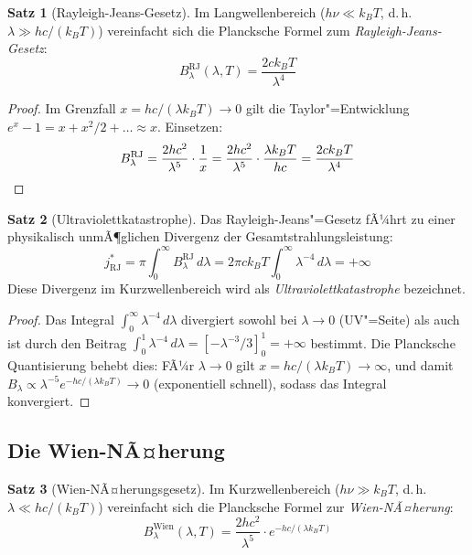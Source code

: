 ﻿\documentclass[a4paper,12pt]{article}
\theoremstyle{definition}
\newtheorem{satz}{Satz}
\begin{document}
\begin{satz}[Rayleigh-Jeans-Gesetz]
\label{satz:rj}
    Im Langwellenbereich ($h\nu \ll k_B T$, d.\,h.\ $\lambda \gg hc/(k_BT)$)
    vereinfacht sich die Plancksche Formel zum \emph{Rayleigh-Jeans-Gesetz}:
    \[
        B_\lambda^{\text{RJ}}(\lambda, T)
        = \frac{2ck_BT}{\lambda^4}
    \]
\end{satz}

\begin{proof}
    Im Grenzfall $x = hc/(\lambda k_BT) \to 0$ gilt die Taylor"=Entwicklung
    $e^x - 1 = x + x^2/2 + \ldots \approx x$. Einsetzen:
    \[
        B_\lambda^{\text{RJ}} = \frac{2hc^2}{\lambda^5} \cdot \frac{1}{x}
        = \frac{2hc^2}{\lambda^5} \cdot \frac{\lambda k_BT}{hc}
        = \frac{2ck_BT}{\lambda^4} \qedhere
    \]
\end{proof}

\begin{satz}[Ultraviolettkatastrophe]
\label{satz:uv}
    Das Rayleigh-Jeans"=Gesetz fÃ¼hrt zu einer physikalisch unmÃ¶glichen Divergenz
    der Gesamtstrahlungsleistung:
    \[
        j^*_{\text{RJ}} = \pi \int_0^\infty B_\lambda^{\text{RJ}}\,d\lambda
        = 2\pi c k_B T \int_0^\infty \lambda^{-4}\,d\lambda = +\infty
    \]
    Diese Divergenz im Kurzwellenbereich wird als \emph{Ultraviolettkatastrophe}
    bezeichnet.
\end{satz}

\begin{proof}
    Das Integral $\int_0^\infty \lambda^{-4}\,d\lambda$ divergiert sowohl bei
    $\lambda \to 0$ (UV"=Seite) als auch ist durch den Beitrag
    $\int_0^1 \lambda^{-4}\,d\lambda = [-\lambda^{-3}/3]_0^1 = +\infty$
    bestimmt. Die Plancksche Quantisierung behebt dies: FÃ¼r $\lambda \to 0$
    gilt $x = hc/(\lambda k_BT) \to \infty$, und damit
    $B_\lambda \propto \lambda^{-5} e^{-hc/(\lambda k_BT)} \to 0$
    (exponentiell schnell), sodass das Integral konvergiert. \qedhere
\end{proof}

\subsection{Die Wien-NÃ¤herung}

\begin{satz}[Wien-NÃ¤herungsgesetz]
    Im Kurzwellenbereich ($h\nu \gg k_BT$, d.\,h.\ $\lambda \ll hc/(k_BT)$)
    vereinfacht sich die Plancksche Formel zur \emph{Wien-NÃ¤herung}:
    \[
        B_\lambda^{\text{Wien}}(\lambda, T)
        = \frac{2hc^2}{\lambda^5} \cdot e^{-hc/(\lambda k_BT)}
    \]
\end{satz}
\end{document}
